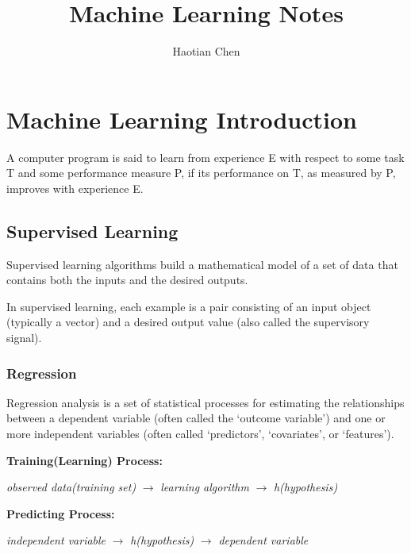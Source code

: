 \documentclass{article}
\title{Machine Learning Notes}
\author{Haotian Chen}
\date{}
\begin{document}
\maketitle

\clearpage

\tableofcontents{}

\clearpage

\section{Machine Learning Introduction}

A computer program is said to learn
from experience E with respect to some task T
and some performance measure P, if its
performance on T, as measured by P, improves
with experience E. 

\subsection{Supervised Learning}

Supervised learning algorithms build a mathematical model 
of a set of data that contains both the inputs and the desired 
outputs.

\bigskip

\noindent In supervised learning, each example is a 
pair consisting of an input object (typically a vector) 
and a desired output value (also called the supervisory signal).

\subsubsection{Regression}

Regression analysis is a set of statistical processes 
for estimating the relationships between a dependent 
variable (often called the `outcome variable') and one 
or more independent variables (often called `predictors', 
`covariates', or `features').

\bigskip

\noindent \textbf{Training(Learning) Process:}

\noindent \textit{observed data(training set)} $\rightarrow$ \textit{learning algorithm} $\rightarrow$ \textit{h(hypothesis)}

\bigskip

\noindent \textbf{Predicting Process:}

\noindent \textit{independent variable} $\rightarrow$ \textit{h(hypothesis)} $\rightarrow$ \textit{dependent variable}
\end{document}
